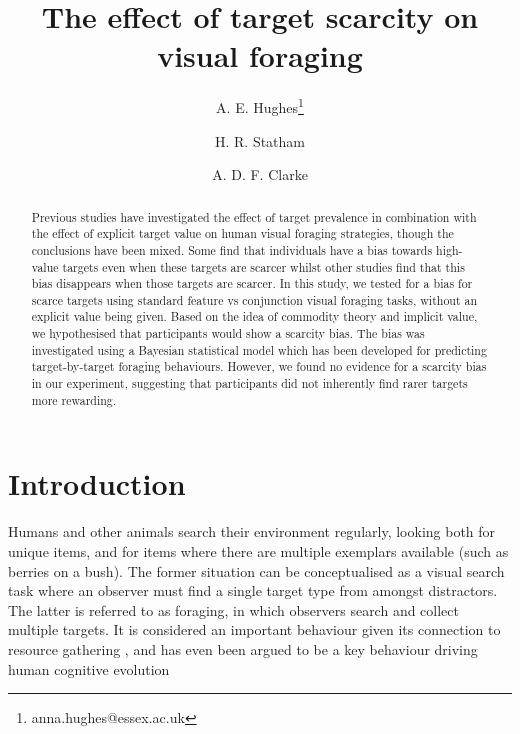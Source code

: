 \documentclass[12pt]{article}
\begin{document}
\title{The effect of target scarcity on visual foraging}

\author[1]{A. E. Hughes\footnote{anna.hughes@essex.ac.uk}}
\author[2]{H. R. Statham}
\author[1]{A. D. F. Clarke}

\maketitle

\linenumbers

\begin{abstract}
Previous studies have investigated the effect of target prevalence in combination with the effect of explicit target value on human visual foraging strategies, though the conclusions have been mixed. Some find that individuals have a bias towards high-value targets even when these targets are scarcer whilst other studies find that this bias disappears when those targets are scarcer. In this study, we tested for a bias for scarce targets using standard feature vs conjunction visual foraging tasks, without an explicit value being given. Based on the idea of commodity theory and implicit value, we hypothesised that participants would show a scarcity bias. The bias was investigated using a Bayesian statistical model which has been developed for predicting target-by-target foraging behaviours. However, we found no evidence for a scarcity bias in our experiment, suggesting that participants did not inherently find rarer targets more rewarding.
\end{abstract}


\section{Introduction}

Humans and other animals search their environment regularly, looking both for unique items, and for items where there are multiple exemplars available (such as berries on a bush). The former situation can be conceptualised as a visual search task where an observer must find a single target type from amongst distractors. The latter is referred to as foraging, in which observers search and collect multiple targets. It is considered an important behaviour given its connection to resource gathering \citep{bella2021foraging}, and has even been argued to be a key behaviour driving human cognitive evolution \citep{hills2015exploration, pretelli2022foraging}
\end{document}
